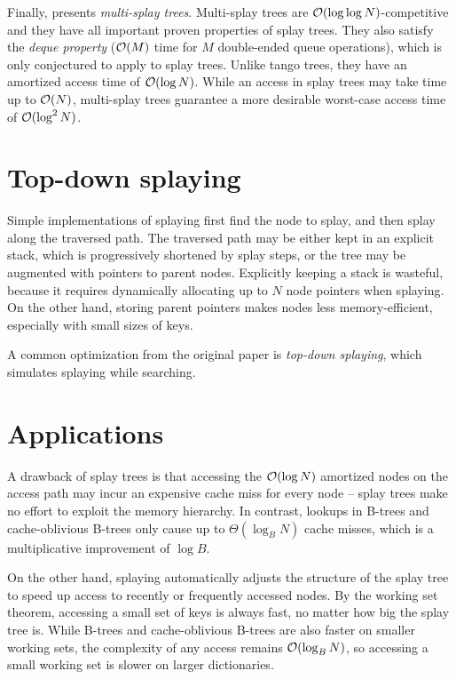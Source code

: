 Finally, \cite{multisplay-trees} presents \emph{multi-splay trees}.
Multi-splay trees are $\mathcal{O}(\log\log N)$-competitive and they have all important
proven properties of splay trees. They also satisfy the \emph{deque property}
($\mathcal{O}(M)$ time for $M$ double-ended queue operations), which is only conjectured
to apply to splay trees.
Unlike tango trees, they have an amortized access time of $\mathcal{O}(\log N)$.
While an access in splay trees may take time up to $\mathcal{O}(N)$, multi-splay trees
guarantee a more desirable worst-case access time of $\mathcal{O}(\log^2 N)$.

\section{Top-down splaying}
Simple implementations of splaying first find the node to splay, and then
splay along the traversed path. The traversed path may be either kept
in an explicit stack, which is progressively shortened by splay steps,
or the tree may be augmented with pointers to parent nodes.
Explicitly keeping a stack is wasteful, because it requires dynamically
allocating up to $N$ node pointers when splaying. On the other hand,
storing parent pointers makes nodes less memory-efficient, especially
with small sizes of keys.

A common optimization from the original paper \cite{splay} is
\emph{top-down splaying}, which simulates splaying while searching.

\section{Applications}
A drawback of splay trees is that accessing the $\mathcal{O}(\log N)$ amortized
nodes on the access path may incur an expensive cache miss for every node --
splay trees make no effort to exploit the memory hierarchy.
In contrast, lookups in B-trees and cache-oblivious B-trees
only cause up to $\Theta(\log_B N)$ cache misses, which is a multiplicative
improvement of $\log B$.

On the other hand, splaying automatically adjusts the structure of the splay
tree to speed up access to recently or frequently accessed nodes. By the
working set theorem, accessing a small set of keys is always fast, no matter
how big the splay tree is. While B-trees and cache-oblivious B-trees are
also faster on smaller working sets, the complexity of any access remains
$\mathcal{O}(\log_B N)$, so accessing a small working set is slower on larger
dictionaries.

